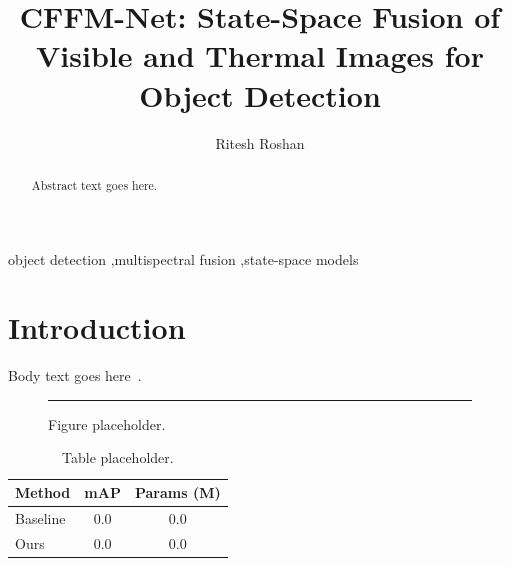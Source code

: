 \documentclass[review,3p,times]{elsarticle}
\begin{document}
\begin{frontmatter}

\title{CFFM-Net: State-Space Fusion of Visible and Thermal Images for Object Detection}

\author{Ritesh Roshan}

\begin{abstract}
Abstract text goes here.
\end{abstract}

\begin{keyword}
object detection \sep multispectral fusion \sep state-space models
\end{keyword}

\end{frontmatter}

\section{Introduction}
\label{sec:intro}
Body text goes here~\cite{gu2023mamba}.

\begin{figure}[t]
  \centering
  \rule{0.9\linewidth}{4cm}
  \caption{Figure placeholder.}
  \label{fig:placeholder}
\end{figure}

\begin{table}[t]
  \centering
  \begin{tabular}{lcc}
    \toprule
    Method & mAP & Params (M) \\
    \midrule
    Baseline & 0.0 & 0.0 \\
    Ours & 0.0 & 0.0 \\
    \bottomrule
  \end{tabular}
  \caption{Table placeholder.}
  \label{tab:placeholder}
\end{table}



\end{document}

